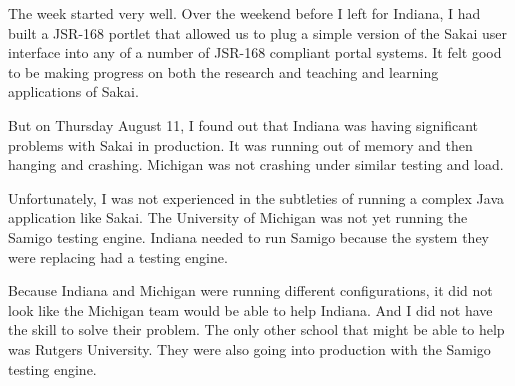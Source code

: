 \documentclass[12pt]{book}
\begin{document}
The week started very well. Over the weekend before
I left for Indiana, I had built a JSR-168 portlet that allowed
us to plug a simple version of the Sakai user interface into
any of a number of JSR-168 compliant portal systems.  It felt
good to be making progress on both the research and teaching
and learning applications of Sakai.

But on Thursday August 11, I found out that Indiana was having
significant problems with Sakai in production.  It was running
out of memory and then hanging and crashing.  Michigan was not
crashing under similar testing and load.

Unfortunately, I was not experienced in the subtleties of
running a complex Java application like Sakai.  The
University of Michigan was not yet running the Samigo testing
engine.  Indiana needed to run Samigo because the system they
were replacing had a testing engine.

Because Indiana and Michigan were running different
configurations, it did not look like the Michigan team would
be able to help Indiana.  And I did not have the skill to
solve their problem.  The only other school that might be
able to help was Rutgers University.  They were also going
into production with the Samigo testing engine.
\end{document}
